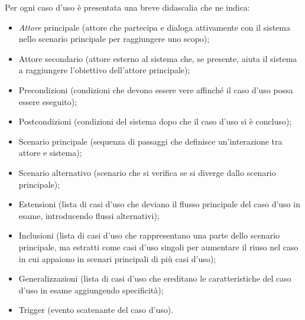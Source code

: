 \documentclass[10pt, a4paper]{article}
\begin{document}
Per ogni caso d'uso è presentata una breve didascalia che ne indica:
\begin{itemize}
    \item \textit{Attore\pg} principale (attore che partecipa e dialoga attivamente con il sistema nello scenario principale per raggiungere uno scopo);
    \item Attore secondario (attore esterno al sistema che, se presente, aiuta il sistema a raggiungere l'obiettivo dell'attore principale);
    \item Precondizioni (condizioni che devono essere vere affinché il caso d'uso possa essere eseguito);
    \item Postcondizioni (condizioni del sistema dopo che il caso d'uso si è concluso);
    \item Scenario principale (sequenza di passaggi che definisce un'interazione tra attore e sistema);
    \item Scenario alternativo (scenario che si verifica se si diverge dallo scenario principale);
    \item Estensioni (lista di casi d'uso che deviano il flusso principale del caso d'uso in esame, introducendo flussi alternativi);
    \item Inclusioni (lista di casi d'uso che rappresentano una parte dello scenario principale, ma estratti come casi d'uso singoli per aumentare il riuso nel caso in cui appaiono in scenari principali di più casi d'uso);
    \item Generalizzazioni (lista di casi d'uso che ereditano le caratteristiche del caso d'uso in esame aggiungendo specificità);
    \item Trigger (evento scatenante del caso d'uso).
\end{itemize}
\end{document}
